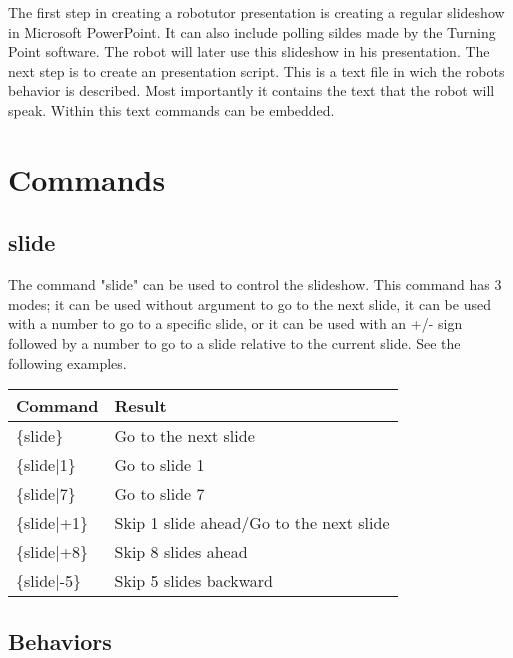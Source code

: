 The first step in creating a robotutor presentation is creating a regular slideshow in Microsoft PowerPoint. It can also include polling sildes made by the Turning Point software. The robot will later use this slideshow in his presentation. The next step is to create an presentation script. This is a text file in wich the robots behavior is described. Most importantly it contains the text that the robot will speak. Within this text commands can be embedded.


\section{Commands}
\subsection{slide}
The command "slide" can be used to control the slideshow. This command has 3 modes; it can be used without argument to go to the next slide, it can be used with a number to go to a specific slide, or it can be used with an +/- sign followed by a number to go to a slide relative to the current slide. See the following examples.


\begin{table}[h!]
\begin{tabular}{|l|l|}
\hline
Command & Result\\ \hline
\{slide\}& Go to the next slide\\ 
\{slide|1\}  & Go to slide 1\\ 
\{slide|7\}  & Go to slide 7\\ 
\{slide|+1\} & Skip 1 slide ahead/Go to the next slide \\ 
\{slide|+8\} & Skip 8 slides ahead\\ 
\{slide|-5\} & Skip 5 slides backward\\
\hline
\end{tabular}
\end{table}


\subsection{Behaviors}


